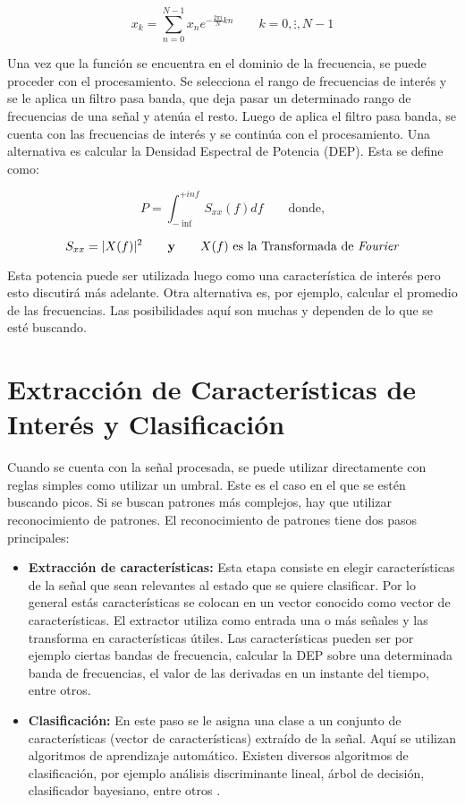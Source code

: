 $$ x_{k} = \sum_{n=0}^{N-1} x_{n}e^{-\frac{2 \pi i}{N}kn} \qquad k = 0,\vdots, N - 1 $$

Una vez que la función se encuentra en el dominio de la frecuencia, se puede proceder con el procesamiento. Se selecciona el rango de frecuencias de interés y se le aplica un filtro pasa banda, que deja pasar un determinado rango de frecuencias de una señal y atenúa el resto. Luego de aplica el filtro pasa banda,  se cuenta con las frecuencias de interés y se continúa con el procesamiento. Una alternativa es calcular la Densidad Espectral de Potencia (DEP). Esta se define como:

$$ P = \int_{-\inf}^{+inf} S_{xx} (f) df \qquad  \textrm{donde,}$$

$$ S_{xx} = |X(f)|^{2} \qquad \textbf{y} \qquad X(f) \textrm{ es la Transformada de \emph{Fourier}} $$

Esta potencia puede ser utilizada luego como una característica de interés pero esto discutirá más adelante. Otra alternativa  es, por ejemplo, calcular el promedio de las frecuencias. Las posibilidades aquí son muchas y dependen de lo que se esté buscando.

\section{Extracción de Características de Interés y Clasificación}

Cuando se cuenta con la señal procesada, se puede utilizar directamente con reglas simples como utilizar un umbral. Este es el caso en el que se estén buscando picos. Si se buscan patrones más complejos, hay que utilizar reconocimiento de patrones. El reconocimiento de patrones tiene dos pasos principales:

\begin{itemize}
  \item \textbf{Extracción de características:} Esta etapa consiste en elegir características de la señal que sean relevantes al estado que se quiere clasificar. Por lo general estás características se colocan en un vector conocido como vector de características. El extractor utiliza como entrada una o más señales y las transforma en características útiles. Las características pueden ser por ejemplo ciertas bandas de frecuencia, calcular la DEP sobre una determinada banda de frecuencias, el valor de las derivadas en un instante del tiempo, entre otros. 
  \item \textbf{Clasificación:} En este paso se le asigna una clase a un conjunto de características (vector de características) extraído de la señal. Aquí se utilizan algoritmos de aprendizaje automático. Existen diversos algoritmos de clasificación, por ejemplo análisis discriminante lineal, árbol de decisión, clasificador bayesiano, entre otros \cite{eeg-tutorial}.
\end{itemize}


